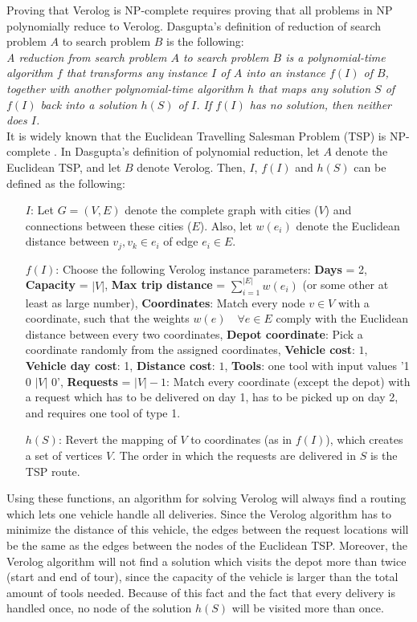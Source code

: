 \documentclass[a4paper]{article}
\begin{document}
Proving that Verolog is NP-complete requires proving that all problems in NP polynomially reduce to Verolog. Dasgupta's definition of reduction of search problem $A$ to search problem $B$ is the following: \\

\emph{A reduction from search problem $A$ to search problem $B$ is a polynomial-time algorithm $f$ that transforms any instance $I$ of $A$ into an instance $f(I)$ of $B$, together with another polynomial-time algorithm $h$ that maps any solution $S$ of $f(I)$ back into a solution $h(S)$ of $I$. If $f(I)$ has no solution, then neither does $I$.} \\

It is widely known that the Euclidean Travelling Salesman Problem (TSP) is NP-complete \citep{papadimitriou1977}. In Dasgupta's definition of polynomial reduction, let $A$ denote the Euclidean TSP, and let $B$ denote Verolog. Then, $I$, $f(I)$ and $h(S)$ can be defined as the following:
\begin{itemize}
	\item[$I$:] Let $G=(V,E)$ denote the complete graph with cities ($V$) and connections between these cities ($E$). Also, let $w(e_i)$ denote the Euclidean distance between $v_j, v_k \in e_i$ of edge $e_i \in E$.
	\item[$f(I)$:] Choose the following Verolog instance parameters: \textbf{Days} = 2, \textbf{Capacity} = $|V|$,  \textbf{Max trip distance} = $\sum_{i=1}^{|E|}w(e_i)$ (or some other at least as large number), \textbf{Coordinates}: Match every node $v \in V$ with a coordinate, such that the weights $w(e) \quad \forall e \in E$ comply with the Euclidean distance between every two coordinates, \textbf{Depot coordinate}: Pick a coordinate randomly from the assigned coordinates, \textbf{Vehicle cost}: $1$, \textbf{Vehicle day cost}: 1, \textbf{Distance cost}: $1$, \textbf{Tools}: one tool with input values '1 0 $|V|$ 0', \textbf{Requests} = $|V|-1$: Match every coordinate (except the depot) with a request which has to be delivered on day 1, has to be picked up on day 2, and requires one tool of type 1.
	\item[$h(S)$:] Revert the mapping of $V$ to coordinates (as in $f(I)$), which creates a set of vertices $V$. The order in which the requests are delivered in $S$ is the TSP route. 
\end{itemize}
Using these functions, an algorithm for solving Verolog will always find a routing which lets one vehicle handle all deliveries. Since the Verolog algorithm has to minimize the distance of this vehicle, the edges between the request locations will be the same as the edges between the nodes of the Euclidean TSP. Moreover, the Verolog algorithm will not find a solution which visits the depot more than twice (start and end of tour), since the capacity of the vehicle is larger than the total amount of tools needed. Because of this fact and the fact that every delivery is handled once, no node of the solution $h(S)$ will be visited more than once.
\end{document}
